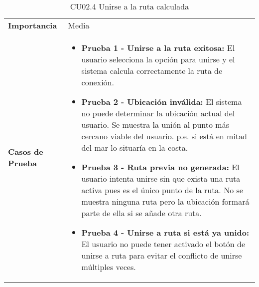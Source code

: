 \begin{table}[H]
\begin{tabularx}{\linewidth}{ p{} p{} }
		\textbf{Importancia}          & Media \\
		\textbf{Casos de Prueba}      &
		\begin{itemize}
			\item \textbf{Prueba 1 - Unirse a la ruta exitosa:} El usuario selecciona la opción para unirse y el sistema calcula correctamente la ruta de conexión.
			\vspace{2pt}
			\item \textbf{Prueba 2 - Ubicación inválida:} El sistema no puede determinar la ubicación actual del usuario. Se muestra la unión al punto más cercano viable del usuario. p.e. si está en mitad del mar lo situaría en la costa.
			\vspace{2pt}
			\item \textbf{Prueba 3 - Ruta previa no generada:} El usuario intenta unirse sin que exista una ruta activa pues es el único punto de la ruta. No se muestra ninguna ruta pero la ubicación formará parte de ella si se añade otra ruta.
			\vspace{2pt}
			\item \textbf{Prueba 4 - Unirse a ruta si está ya unido:} El usuario no puede tener activado el botón de unirse a ruta para evitar el conflicto de unirse múltiples veces.
		\end{itemize} \\
		\bottomrule
	\end{tabularx}
	\caption{CU02.4 Unirse a la ruta calculada}
	\label{cu:unirse-ruta}
\end{table}


